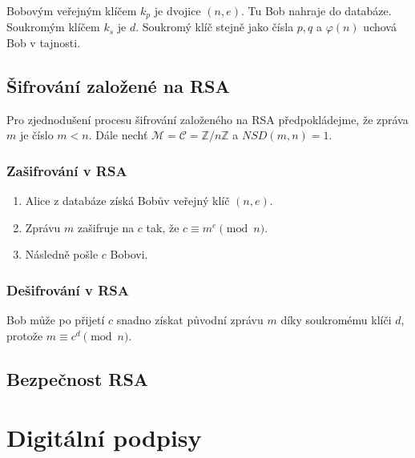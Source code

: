 \documentclass[
  program=infoi,
  biblatex,
  figures=false,
  glossaries,
  index
]{kidiplom}
\begin{document}
        Bobovým veřejným klíčem $k_p$ je dvojice $(n, e)$. Tu Bob nahraje do databáze.
        Soukromým klíčem $k_s$ je $d$. Soukromý klíč stejně jako čísla $p, q$ a $\varphi(n)$ uchová Bob v tajnosti.


    \subsection{Šifrování založené na RSA}

        Pro zjednodušení procesu šifrování založeného na RSA předpokládejme, že zpráva $m$ je číslo $m < n$.
        Dále nechť $\mathcal{M} = \mathcal{C} = \mathbb{Z}/n\mathbb{Z}$ a $NSD(m, n) = 1$.

        \subsubsection{Zašifrování v RSA}
            \begin{enumerate}
                \item 
                    Alice z databáze získá Bobův veřejný klíč $(n,e)$.
                \item
                    Zprávu $m$ zašifruje na $c$ tak, že $c \equiv m^e \pmod{n}$.
                \item    
                    Následně pošle $c$ Bobovi.
            \end{enumerate}

        \subsubsection{Dešifrování v RSA}
            Bob může po přijetí $c$ snadno získat původní zprávu $m$ díky soukromému klíči $d$, protože $m \equiv c^d \pmod{n}$.
            

    \subsection{Bezpečnost RSA}\label{sub:RSA-security}








\section{Digitální podpisy}\label{sec:digital-signatures}
\end{document}
